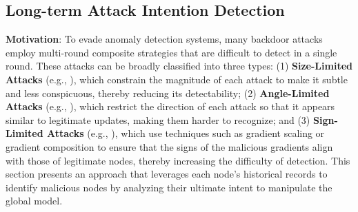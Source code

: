\documentclass[lettersize,journal]{IEEEtran}
\begin{document}
\subsection{Long-term Attack Intention Detection}

\textbf{Motivation}: To evade anomaly detection systems, many backdoor attacks employ multi-round composite strategies that are difficult to detect in a single round. These attacks can be broadly classified into three types: (1) \textbf{Size-Limited Attacks} (e.g., \cite{geisler2024attacking, chen2024optimal}), which constrain the magnitude of each attack to make it subtle and less conspicuous, thereby reducing its detectability; (2) \textbf{Angle-Limited Attacks} (e.g., \cite{you2023three, sagliano2024powered, dong2023adaptive}), which restrict the direction of each attack so that it appears similar to legitimate updates, making them harder to recognize; and (3) \textbf{Sign-Limited Attacks} (e.g., \cite{wan2023average, zhu2023boosting}), which use techniques such as gradient scaling or gradient composition to ensure that the signs of the malicious gradients align with those of legitimate nodes, thereby increasing the difficulty of detection. This section presents an approach that leverages each node's historical records to identify malicious nodes by analyzing their ultimate intent to manipulate the global model.



\end{document}
